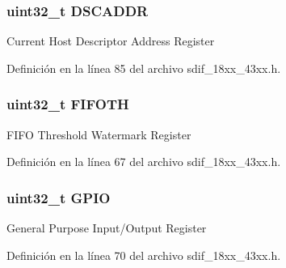 \subsubsection[{\texorpdfstring{D\+S\+C\+A\+D\+DR}{DSCADDR}}]{ uint32\+\_\+t D\+S\+C\+A\+D\+DR}\hypertarget{struct_l_p_c___s_d_m_m_c___t_a939100face4afe28dd230579b3b46df4}{}\label{struct_l_p_c___s_d_m_m_c___t_a939100face4afe28dd230579b3b46df4}
Current Host Descriptor Address Register 

Definición en la línea 85 del archivo sdif\+\_\+18xx\+\_\+43xx.\+h.

\subsubsection[{\texorpdfstring{F\+I\+F\+O\+TH}{FIFOTH}}]{ uint32\+\_\+t F\+I\+F\+O\+TH}\hypertarget{struct_l_p_c___s_d_m_m_c___t_a544e89ebe218a357da4bb5dc63577094}{}\label{struct_l_p_c___s_d_m_m_c___t_a544e89ebe218a357da4bb5dc63577094}
F\+I\+FO Threshold Watermark Register 

Definición en la línea 67 del archivo sdif\+\_\+18xx\+\_\+43xx.\+h.

\subsubsection[{\texorpdfstring{G\+P\+IO}{GPIO}}]{ uint32\+\_\+t G\+P\+IO}\hypertarget{struct_l_p_c___s_d_m_m_c___t_aa172d5c5fff46adafbd37892a1206432}{}\label{struct_l_p_c___s_d_m_m_c___t_aa172d5c5fff46adafbd37892a1206432}
General Purpose Input/\+Output Register 

Definición en la línea 70 del archivo sdif\+\_\+18xx\+\_\+43xx.\+h.

